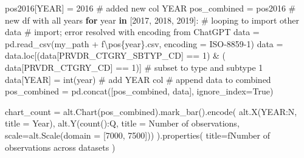 \documentclass[
  letterpaper,
  DIV=11,
  numbers=noendperiod]{scrartcl}
\newenvironment{Shaded}{\begin{snugshade}}{\end{snugshade}}
\newcommand{\BuiltInTok}[1]{\textcolor[rgb]{0.00,0.23,0.31}{#1}}
\newcommand{\CommentTok}[1]{\textcolor[rgb]{0.37,0.37,0.37}{#1}}
\newcommand{\ControlFlowTok}[1]{\textcolor[rgb]{0.00,0.23,0.31}{\textbf{#1}}}
\newcommand{\DecValTok}[1]{\textcolor[rgb]{0.68,0.00,0.00}{#1}}
\newcommand{\KeywordTok}[1]{\textcolor[rgb]{0.00,0.23,0.31}{\textbf{#1}}}
\newcommand{\NormalTok}[1]{\textcolor[rgb]{0.00,0.23,0.31}{#1}}
\newcommand{\OperatorTok}[1]{\textcolor[rgb]{0.37,0.37,0.37}{#1}}
\newcommand{\SpecialCharTok}[1]{\textcolor[rgb]{0.37,0.37,0.37}{#1}}
\newcommand{\SpecialStringTok}[1]{\textcolor[rgb]{0.13,0.47,0.30}{#1}}
\newcommand{\StringTok}[1]{\textcolor[rgb]{0.13,0.47,0.30}{#1}}
\newcommand{\VariableTok}[1]{\textcolor[rgb]{0.07,0.07,0.07}{#1}}
\begin{document}
\begin{Shaded}
\begin{Highlighting}[]
\NormalTok{pos2016[}\StringTok{\textquotesingle{}YEAR\textquotesingle{}}\NormalTok{] }\OperatorTok{=} \DecValTok{2016}  \CommentTok{\# added new col YEAR}
\NormalTok{pos\_combined }\OperatorTok{=}\NormalTok{ pos2016  }\CommentTok{\# new df with all years}
\ControlFlowTok{for}\NormalTok{ year }\KeywordTok{in}\NormalTok{ [}\StringTok{\textquotesingle{}2017\textquotesingle{}}\NormalTok{, }\StringTok{\textquotesingle{}2018\textquotesingle{}}\NormalTok{, }\StringTok{\textquotesingle{}2019\textquotesingle{}}\NormalTok{]:  }\CommentTok{\# looping to import other data}
    \CommentTok{\# import; error resolved with encoding from ChatGPT}
\NormalTok{    data }\OperatorTok{=}\NormalTok{ pd.read\_csv(my\_path }\OperatorTok{+} \SpecialStringTok{f\textquotesingle{}\textbackslash{}pos}\SpecialCharTok{\{}\NormalTok{year}\SpecialCharTok{\}}\SpecialStringTok{.csv\textquotesingle{}}\NormalTok{, encoding }\OperatorTok{=} \StringTok{\textquotesingle{}ISO{-}8859{-}1\textquotesingle{}}\NormalTok{)}
\NormalTok{    data }\OperatorTok{=}\NormalTok{ data.loc[(data[}\StringTok{\textquotesingle{}PRVDR\_CTGRY\_SBTYP\_CD\textquotesingle{}}\NormalTok{] }\OperatorTok{==} \DecValTok{1}\NormalTok{) }\OperatorTok{\&}\NormalTok{ (}
\NormalTok{        data[}\StringTok{\textquotesingle{}PRVDR\_CTGRY\_CD\textquotesingle{}}\NormalTok{] }\OperatorTok{==} \DecValTok{1}\NormalTok{)]  }\CommentTok{\# subset to type and subtype 1}
\NormalTok{    data[}\StringTok{\textquotesingle{}YEAR\textquotesingle{}}\NormalTok{] }\OperatorTok{=} \BuiltInTok{int}\NormalTok{(year)  }\CommentTok{\# add YEAR col}
    \CommentTok{\# append data to combined}
\NormalTok{    pos\_combined }\OperatorTok{=}\NormalTok{ pd.concat([pos\_combined, data], ignore\_index}\OperatorTok{=}\VariableTok{True}\NormalTok{)}


\NormalTok{chart\_count }\OperatorTok{=}\NormalTok{ alt.Chart(pos\_combined).mark\_bar().encode(}
\NormalTok{    alt.X(}\StringTok{\textquotesingle{}YEAR:N\textquotesingle{}}\NormalTok{, title }\OperatorTok{=} \StringTok{\textquotesingle{}Year\textquotesingle{}}\NormalTok{),}
\NormalTok{    alt.Y(}\StringTok{\textquotesingle{}count():Q\textquotesingle{}}\NormalTok{, title }\OperatorTok{=} \StringTok{\textquotesingle{}Number of observations\textquotesingle{}}\NormalTok{,}
\NormalTok{          scale}\OperatorTok{=}\NormalTok{alt.Scale(domain }\OperatorTok{=}\NormalTok{ [}\DecValTok{7000}\NormalTok{, }\DecValTok{7500}\NormalTok{]))}
\NormalTok{).properties(}
\NormalTok{        title}\OperatorTok{=}\SpecialStringTok{f\textquotesingle{}Number of observations across datasets\textquotesingle{}}
\NormalTok{    )}


\end{Highlighting}
\end{Shaded}
\end{document}
